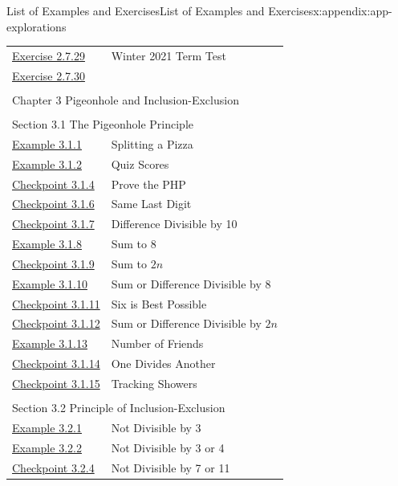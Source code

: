 \documentclass[oneside,10pt,]{book}
\numberwithin{equation}{section}
\begin{document}
\begin{appendixptx}{List of Examples and Exercises}{}{List of Examples and Exercises}{}{}{x:appendix:app-explorations}
\begin{longtable}[l]{ll}
\hyperlink{g:exercise:id531742}{Exercise 2.7.29}& Winter 2021 Term Test\\
\hyperlink{g:exercise:id531752}{Exercise 2.7.30}& \\
\multicolumn{2}{l}{\null}\\[1.5ex] \multicolumn{2}{l}{\large Chapter 3 Pigeonhole and Inclusion-Exclusion}\\[0.5ex]
\multicolumn{2}{l}{\null}\\[1.5ex] \multicolumn{2}{l}{\large Section 3.1 The Pigeonhole Principle}\\[0.5ex]
\hyperref[x:example:eg-php-pizza]{Example 3.1.1}& Splitting a Pizza\\
\hyperref[x:example:eg-php-quiz-scores]{Example 3.1.2}& Quiz Scores\\
\hyperref[x:exercise:ex-php-proof]{Checkpoint 3.1.4}& Prove the PHP\\
\hyperref[x:exercise:ex-php-last-digit]{Checkpoint 3.1.6}& Same Last Digit\\
\hyperref[x:exercise:ex-php-difference-divisible]{Checkpoint 3.1.7}& Difference Divisible by 10\\
\hyperref[x:example:eg-php-sum-to-8]{Example 3.1.8}& Sum to 8\\
\hyperref[x:exercise:ex-php-sum-to-2n]{Checkpoint 3.1.9}& Sum to \(2n\)\\
\hyperref[x:example:eg-php-sum-diff-8]{Example 3.1.10}& Sum or Difference Divisible by 8\\
\hyperref[x:exercise:ex-php-sum-diff-8-best]{Checkpoint 3.1.11}& Six is Best Possible\\
\hyperref[x:exercise:ex-php-sum-diff-2n]{Checkpoint 3.1.12}& Sum or Difference Divisible by \(2n\)\\
\hyperref[x:example:ex-php-friends]{Example 3.1.13}& Number of Friends\\
\hyperref[x:exercise:ex-php-divides]{Checkpoint 3.1.14}& One Divides Another\\
\hyperref[x:exercise:ex-php-shower]{Checkpoint 3.1.15}& Tracking Showers\\
\multicolumn{2}{l}{\null}\\[1.5ex] \multicolumn{2}{l}{\large Section 3.2 Principle of Inclusion-Exclusion}\\[0.5ex]
\hyperref[x:example:eg-pie-divisible-3]{Example 3.2.1}& Not Divisible by 3\\
\hyperref[x:example:eg-pie-divisible-3-4]{Example 3.2.2}& Not Divisible by 3 or 4\\
\hyperref[x:exercise:ex-pie-divisible-7-11]{Checkpoint 3.2.4}& Not Divisible by 7 or 11\\

\end{longtable}
\end{appendixptx}
\end{document}
